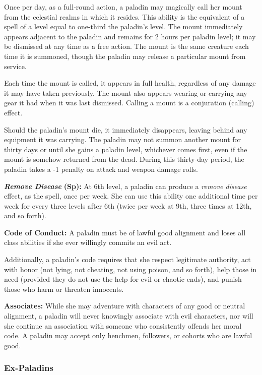\documentclass{article}
\begin{document}
Once per day, as a full-round action, a paladin may magically call her mount from 
the celestial realms in which it resides. This ability is the equivalent of a spell 
of a level equal to one-third the paladin's level. The mount immediately appears 
adjacent to the paladin and remains for 2 hours per paladin level; it may be dismissed 
at any time as a free action. The mount is the same creature each time it is summoned, 
though the paladin may release a particular mount from service.

Each time the mount is called, it appears in full health, regardless of any damage 
it may have taken previously. The mount also appears wearing or carrying any gear 
it had when it was last dismissed. Calling a mount is a conjuration (calling) effect.

Should the paladin's mount die, it immediately disappears, leaving behind any equipment 
it was carrying. The paladin may not summon another mount for thirty days or until 
she gains a paladin level, whichever comes first, even if the mount is somehow 
returned from the dead. During this thirty-day period, the paladin takes a -1 penalty 
on attack and weapon damage rolls.

\textit{\textbf{Remove Disease }}\textbf{(Sp):} At 6th level, a paladin can produce 
a \textit{remove disease }effect, as the spell, once per week. She can use this 
ability one additional time per week for every three levels after 6th (twice per 
week at 9th, three times at 12th, and so forth).

\textbf{Code of Conduct:} A paladin must be of lawful good alignment and loses 
all class abilities if she ever willingly commits an evil act.

Additionally, a paladin's code requires that she respect legitimate authority, 
act with honor (not lying, not cheating, not using poison, and so forth), help 
those in need (provided they do not use the help for evil or chaotic ends), and 
punish those who harm or threaten innocents.

\textbf{Associates:} While she may adventure with characters of any good or neutral 
alignment, a paladin will never knowingly associate with evil characters, nor will 
she continue an association with someone who consistently offends her moral code. 
A paladin may accept only henchmen, followers, or cohorts who are lawful good.

\vspace{12pt}
\subsubsection*{\textbf{Ex-Paladins}}
\end{document}
